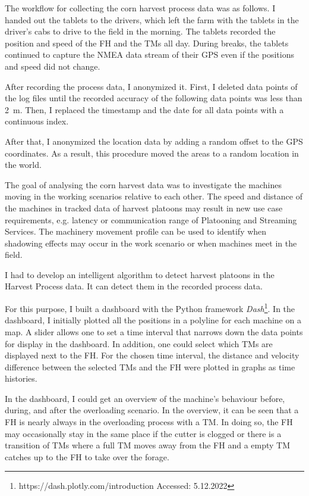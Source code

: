 \documentclass[]{nsm-thesis}
\begin{document}
The workflow for collecting the corn harvest process data was as follows. 
I handed out the tablets to the drivers, which left the farm with the tablets in the driver's cabs to drive to the field in the morning. The tablets recorded the position and speed of the \ac{FH} and the \ac{TM}s all day. During breaks, the tablets continued to capture the NMEA data stream of their GPS even if the positions and speed did not change.

After recording the process data, I anonymized it. 
First, I deleted data points of the log files until the recorded accuracy of the following data points was less than \SI{2}{\metre}. Then, I replaced the timestamp and the date for all data points with a continuous index.

After that, I anonymized the location data by adding a random offset to the GPS coordinates. As a result, this procedure moved the areas to a random location in the world.

The goal of analysing the corn harvest data was to investigate the machines moving in the working scenarios relative to each other. The speed and distance of the machines in tracked data of harvest platoons may result in new use case requirements, e.g. latency or communication range of Platooning and Streaming Services. The machinery movement profile can be used to identify when shadowing effects may occur in the work scenario or when machines meet in the field.

I had to develop an intelligent algorithm to detect harvest platoons in the Harvest Process data. It can detect them in the recorded process data.

For this purpose, I built a dashboard with the Python framework \textit{Dash}\footnote{https://dash.plotly.com/introduction Accessed: 5.12.2022}. In the dashboard, I initially plotted all the positions in a polyline for each machine
on a map. A slider allows one to set a time interval that narrows down the data
points for display in the dashboard. In addition, one could select which \ac{TM}s are displayed next to the \ac{FH}. For the chosen time interval, the distance and velocity difference between the selected \ac{TM}s and the \ac{FH} were plotted in graphs as time histories. 

In the dashboard, I could get an overview of the machine's behaviour 
before, during, and after the overloading scenario.
In the overview, it can be seen that a \ac{FH} is nearly always in the overloading process with a \ac{TM}. In doing so, the \ac{FH} may occasionally stay in the same place if the cutter is clogged or there is a transition of \ac{TM}s where a full \ac{TM} moves away from the \ac{FH} and  a  empty \ac{TM} catches up to the \ac{FH} to take over the forage.
\end{document}
